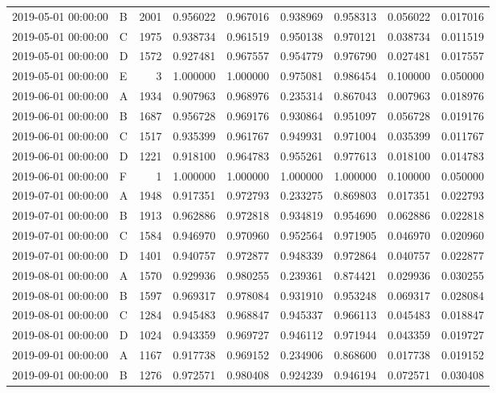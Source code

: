 \begin{tabular}{llrrrrrrr}
2019-05-01 00:00:00 & B & 2001 & 0.956022 & 0.967016 & 0.938969 & 0.958313 & 0.056022 & 0.017016 \\
2019-05-01 00:00:00 & C & 1975 & 0.938734 & 0.961519 & 0.950138 & 0.970121 & 0.038734 & 0.011519 \\
2019-05-01 00:00:00 & D & 1572 & 0.927481 & 0.967557 & 0.954779 & 0.976790 & 0.027481 & 0.017557 \\
2019-05-01 00:00:00 & E & 3 & 1.000000 & 1.000000 & 0.975081 & 0.986454 & 0.100000 & 0.050000 \\
2019-06-01 00:00:00 & A & 1934 & 0.907963 & 0.968976 & 0.235314 & 0.867043 & 0.007963 & 0.018976 \\
2019-06-01 00:00:00 & B & 1687 & 0.956728 & 0.969176 & 0.930864 & 0.951097 & 0.056728 & 0.019176 \\
2019-06-01 00:00:00 & C & 1517 & 0.935399 & 0.961767 & 0.949931 & 0.971004 & 0.035399 & 0.011767 \\
2019-06-01 00:00:00 & D & 1221 & 0.918100 & 0.964783 & 0.955261 & 0.977613 & 0.018100 & 0.014783 \\
2019-06-01 00:00:00 & F & 1 & 1.000000 & 1.000000 & 1.000000 & 1.000000 & 0.100000 & 0.050000 \\
2019-07-01 00:00:00 & A & 1948 & 0.917351 & 0.972793 & 0.233275 & 0.869803 & 0.017351 & 0.022793 \\
2019-07-01 00:00:00 & B & 1913 & 0.962886 & 0.972818 & 0.934819 & 0.954690 & 0.062886 & 0.022818 \\
2019-07-01 00:00:00 & C & 1584 & 0.946970 & 0.970960 & 0.952564 & 0.971905 & 0.046970 & 0.020960 \\
2019-07-01 00:00:00 & D & 1401 & 0.940757 & 0.972877 & 0.948339 & 0.972864 & 0.040757 & 0.022877 \\
2019-08-01 00:00:00 & A & 1570 & 0.929936 & 0.980255 & 0.239361 & 0.874421 & 0.029936 & 0.030255 \\
2019-08-01 00:00:00 & B & 1597 & 0.969317 & 0.978084 & 0.931910 & 0.953248 & 0.069317 & 0.028084 \\
2019-08-01 00:00:00 & C & 1284 & 0.945483 & 0.968847 & 0.945337 & 0.966113 & 0.045483 & 0.018847 \\
2019-08-01 00:00:00 & D & 1024 & 0.943359 & 0.969727 & 0.946112 & 0.971944 & 0.043359 & 0.019727 \\
2019-09-01 00:00:00 & A & 1167 & 0.917738 & 0.969152 & 0.234906 & 0.868600 & 0.017738 & 0.019152 \\
2019-09-01 00:00:00 & B & 1276 & 0.972571 & 0.980408 & 0.924239 & 0.946194 & 0.072571 & 0.030408 \\

\end{tabular}
